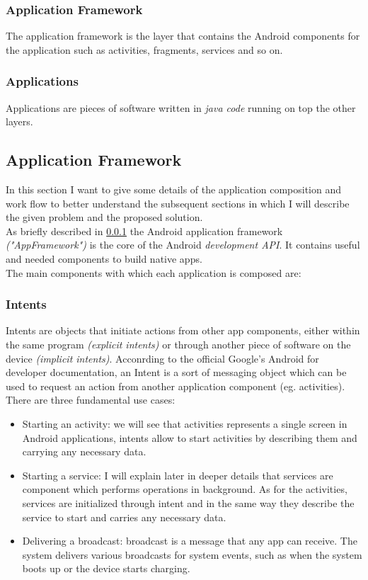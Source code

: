 \subsubsection{Application Framework}\label{appframework}
The application framework is the layer that contains the Android components for the application such as activities, fragments, services and so on. 
\subsubsection{Applications}
Applications are pieces of software written in \textit{java code} running on top the other layers.

\subsection{Application Framework}
In this section I want to give some details of the application composition and work flow to better understand the subsequent sections in which I will describe the given problem and the proposed solution.\\
As briefly described in \ref{appframework} the Android application framework \textit{("AppFramework")} is the core of the Android \textit{development API}. It contains useful and needed components to build native apps.\\
The main components with which each application is composed are:

\subsubsection{Intents} Intents are objects that initiate actions from other app components, either within the same program \textit{(explicit intents)} or through another piece of software on the device \textit{(implicit intents)}.
Acconrding to the official Google's Android for developer documentation, an Intent is a sort of messaging object which can be used to request an action from another application component (eg. activities). There are three fundamental use cases:
\begin{itemize}
	\item Starting an activity: we will see that activities represents a single screen in Android applications, intents allow to start activities by describing them and carrying any necessary data.
	\item Starting a service: I will explain later in deeper details that services are component which performs operations in background. As for the activities, services are initialized through intent and in the same way they describe the service to start and carries any necessary data.
	\item Delivering a broadcast: broadcast is a message that any app can receive. The system delivers various broadcasts for system events, such as when the system boots up or the device starts charging.
\end{itemize}

